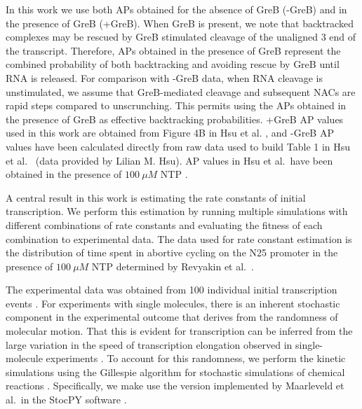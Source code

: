In this work we use both APs obtained for the absence of GreB (-GreB) and in
the presence of GreB (+GreB). When GreB is present, we note that backtracked
complexes may be rescued by GreB stimulated cleavage of the unaligned 3\ppp
end of the transcript. Therefore, APs obtained in the presence of GreB
represent the combined probability of both backtracking and avoiding rescue by
GreB until RNA is released. For comparison with -GreB data, when RNA cleavage
is unstimulated, we assume that GreB-mediated cleavage and subsequent NACs are
rapid steps compared to unscrunching. This permits using the APs obtained in
the presence of GreB as effective backtracking probabilities. +GreB AP values
used in this work are obtained from Figure 4B in Hsu et al.
\cite{hsu_initial_2006}, and -GreB AP values have been calculated directly
from raw data used to build Table 1 in Hsu et al.\ \cite{hsu_initial_2006}
(data provided by Lilian M. Hsu). AP values in Hsu et al.\ have been obtained
in the presence of $100\ \mu M$ NTP \cite{hsu_initial_2006}.

A central result in this work is estimating the rate constants of initial
transcription. We perform this estimation by running multiple simulations with
different combinations of rate constants and evaluating the fitness of each
combination to experimental data. The data used for rate constant estimation
is the distribution of time spent in abortive cycling on the N25 promoter in
the presence of $100\ \mu M$ NTP determined by Revyakin et al.\
\cite{revyakin_abortive_2006}.

The experimental data was obtained from 100 individual initial transcription
events \cite{revyakin_abortive_2006}. For experiments with single molecules,
there is an inherent stochastic component in the experimental outcome that
derives from the randomness of molecular motion. That this is evident for
transcription can be inferred from the large variation in the speed of
transcription elongation observed in single-molecule experiments
\cite{adelman_single_2002, tolic-norrelykke_diversity_2004}. To account for
this randomness, we perform the kinetic simulations using the Gillespie
algorithm for stochastic simulations of chemical reactions
\cite{gillespie_exact_1977}. Specifically, we make use the version implemented
by Maarleveld et al.\ in the StocPY software \cite{maarleveld_stochpy:_2013}.

